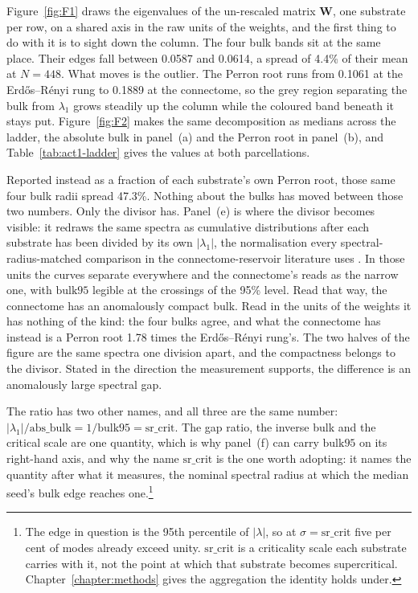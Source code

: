 Figure~\ref{fig:F1} draws the eigenvalues of the un-rescaled matrix $\mathbf{W}$, one
substrate per row, on a shared axis in the raw units of the weights, and the
first thing to do with it is to sight down the column. The four bulk bands sit
at the same place. Their edges fall between
0.0587 %
and 0.0614, %
a spread of 4.4\% %
of their mean at $N = 448$. %
What moves is the outlier. The Perron root runs from
0.1061 %
at the Erdős–Rényi rung to 0.1889 %
at the connectome, so the grey region separating the bulk from $\lambda_1$ grows
steadily up the column while the coloured band beneath it stays put.
Figure~\ref{fig:F2} makes the same decomposition as medians across the ladder,
the absolute bulk in panel~(a) and the Perron root in panel~(b), and
Table~\ref{tab:act1-ladder} gives the values at both parcellations.

Reported instead as a fraction of each substrate's own Perron root, those same
four bulk radii spread 47.3\%. %
Nothing about the bulks has moved between those two numbers. Only the divisor
has. Panel~(e) is where the divisor becomes visible: it redraws the same spectra
as cumulative distributions after each substrate has been divided by its own
$|\lambda_1|$, the normalisation every spectral-radius-matched comparison in the
connectome-reservoir literature
uses \cite{suarez2021learning, suarez2024connectome, milisav2026neuromorphic}.
In those units the curves separate everywhere and the connectome's reads as the
narrow one, with $\mathrm{bulk95}$ legible at the crossings of the 95\% level.
Read that way, the connectome has an anomalously compact bulk.
Read in the units of the weights it has nothing of the kind: the four bulks
agree, and what the connectome has instead is a Perron root
1.78 %
times the Erdős–Rényi rung's. %
The two halves of the figure are the same spectra one division apart, and the
compactness belongs to the divisor. Stated in the direction the measurement
supports, the difference is an anomalously large spectral gap.

The ratio has two other names, and all three are the same number:
$|\lambda_1| / \mathrm{abs\_bulk} = 1/\mathrm{bulk95} = \mathrm{sr\_crit}$. %
The gap ratio, the inverse bulk and the critical scale are one quantity, which
is why panel~(f) can carry $\mathrm{bulk95}$ on its right-hand axis, and why the
name $\mathrm{sr\_crit}$ is the one worth adopting: it names the quantity after
what it measures, the nominal spectral radius at which the median seed's bulk
edge reaches one.\footnote{The edge in question is the 95th percentile of
$|\lambda|$, %
so at $\sigma = \mathrm{sr\_crit}$ five per cent %
of modes already exceed unity. $\mathrm{sr\_crit}$ is a criticality scale each
substrate carries with it, not the point at which that substrate becomes
supercritical. Chapter~\ref{chapter:methods} gives the aggregation the identity
holds under.}

